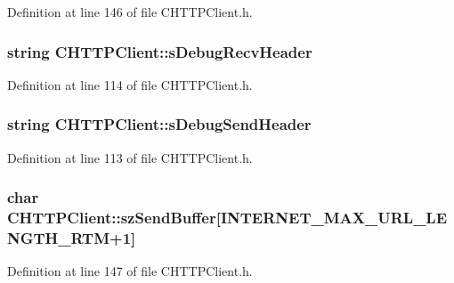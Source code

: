 \-Definition at line 146 of file \-C\-H\-T\-T\-P\-Client.\-h.

\hypertarget{class_c_h_t_t_p_client_ad89f9c067334f868606ba6d00f3afdab}{
\subsubsection[{s\-Debug\-Recv\-Header}]{\setlength{\rightskip}{0pt plus 5cm}string {\bf \-C\-H\-T\-T\-P\-Client\-::s\-Debug\-Recv\-Header}}}\label{class_c_h_t_t_p_client_ad89f9c067334f868606ba6d00f3afdab}


\-Definition at line 114 of file \-C\-H\-T\-T\-P\-Client.\-h.

\hypertarget{class_c_h_t_t_p_client_ae0232e77c7c396d7a6708139f6379ef7}{
\subsubsection[{s\-Debug\-Send\-Header}]{\setlength{\rightskip}{0pt plus 5cm}string {\bf \-C\-H\-T\-T\-P\-Client\-::s\-Debug\-Send\-Header}}}\label{class_c_h_t_t_p_client_ae0232e77c7c396d7a6708139f6379ef7}


\-Definition at line 113 of file \-C\-H\-T\-T\-P\-Client.\-h.

\hypertarget{class_c_h_t_t_p_client_aff047143e60597632e37899b10fab8e2}{
\subsubsection[{sz\-Send\-Buffer}]{\setlength{\rightskip}{0pt plus 5cm}char {\bf \-C\-H\-T\-T\-P\-Client\-::sz\-Send\-Buffer}\mbox{[}{\bf \-I\-N\-T\-E\-R\-N\-E\-T\-\_\-\-M\-A\-X\-\_\-\-U\-R\-L\-\_\-\-L\-E\-N\-G\-T\-H\-\_\-\-R\-T\-M}+1\mbox{]}}}\label{class_c_h_t_t_p_client_aff047143e60597632e37899b10fab8e2}


\-Definition at line 147 of file \-C\-H\-T\-T\-P\-Client.\-h.

